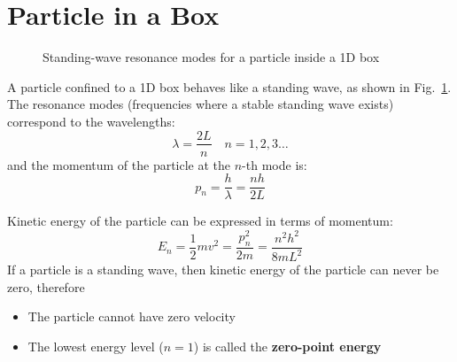 \section{Particle in a Box}

\begin{figure}[ht]
  \centering
  \caption{Standing-wave resonance modes for a particle inside a 1D box}
  \label{fig:particle-in-a-box}
\end{figure}

A particle confined to a 1D box behaves like a standing wave, as shown in
Fig.~\ref{fig:particle-in-a-box}. The resonance modes (frequencies where a
stable standing wave exists) correspond to the wavelengths:
\begin{equation}
  \lambda=\frac{2L}n\quad n=1,2,3\ldots
\end{equation}
and the momentum of the particle at the $n$-th mode is:
\begin{equation}
  p_n=\frac h\lambda=\frac{nh}{2L}
\end{equation}




Kinetic energy of the particle can be expressed in terms of momentum:
\begin{equation}
  E_n=\frac12mv^2=\frac{p_n^2}{2m}=\frac{n^2h^2}{8mL^2}
\end{equation}
If a particle is a standing wave, then kinetic energy of the particle can
never be zero, therefore
\begin{itemize}
\item The particle cannot have zero velocity
\item The lowest energy level ($n=1$) is called the
  \textbf{zero-point energy}
    \end{itemize}

